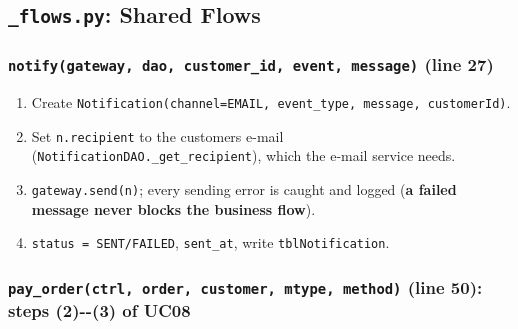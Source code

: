 \hypertarget{flows.py-shared-flows}{%
\subsection{\texorpdfstring{\texttt{\_\allowbreak{}flows.\allowbreak{}py}: Shared
Flows}{\_flows.py: Shared Flows}}\label{flows.py-shared-flows}}

\hypertarget{notifygateway-dao-customer_id-event-message-line-27}{%
\subsubsection{\texorpdfstring{\texttt{notify(\allowbreak{}gateway,\allowbreak{} dao,\allowbreak{} customer\_\allowbreak{}id,\allowbreak{} event,\allowbreak{} message)}
(line
27)}{notify(gateway, dao, customer\_id, event, message) (line 27)}}\label{notifygateway-dao-customer_id-event-message-line-27}}

\begin{enumerate}
\def\labelenumi{\arabic{enumi}.}
\tightlist
\item
  Create
  \texttt{Notification(\allowbreak{}channel=\allowbreak{}EMAIL,\allowbreak{} event\_\allowbreak{}type,\allowbreak{} message,\allowbreak{} customerId)}.
\item
  Set \texttt{n.\allowbreak{}recipient} to the customer\textquotesingle s e-mail
  (\texttt{NotificationDAO.\allowbreak{}\_\allowbreak{}get\_\allowbreak{}recipient}), which the e-mail service
  needs.
\item
  \texttt{gateway.\allowbreak{}send(\allowbreak{}n)}; every sending error is caught and logged
  (\textbf{a failed message never blocks the business flow}).
\item
  \texttt{status =\allowbreak{} SENT/\allowbreak{}FAILED}, \texttt{sent\_\allowbreak{}at}, write
  \texttt{tblNotification}.
\end{enumerate}

\hypertarget{pay_orderctrl-order-customer-mtype-method-line-50-steps-2--3-of-uc08}{%
\subsubsection{\texorpdfstring{\texttt{pay\_\allowbreak{}order(\allowbreak{}ctrl,\allowbreak{} order,\allowbreak{} customer,\allowbreak{} mtype,\allowbreak{} method)}
(line 50): steps (2)-\/-(3) of
UC08}{pay\_order(ctrl, order, customer, mtype, method) (line 50): steps (2)-\/-(3) of UC08}}\label{pay_orderctrl-order-customer-mtype-method-line-50-steps-2--3-of-uc08}}

